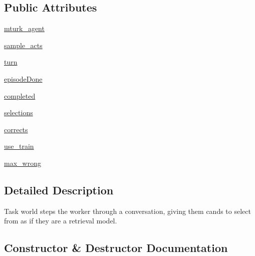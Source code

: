 \subsection*{Public Attributes}
\begin{DoxyCompactItemize}
\item 
\hyperlink{classlight__chat__eval_1_1worlds_1_1LightEvalTaskWorld_ac8f15206b335ec5ea3498a3ee1b0f65f}{mturk\+\_\+agent}
\item 
\hyperlink{classlight__chat__eval_1_1worlds_1_1LightEvalTaskWorld_a60c0b70ca0cfb7d35c2b0eac85df0cf1}{sample\+\_\+acts}
\item 
\hyperlink{classlight__chat__eval_1_1worlds_1_1LightEvalTaskWorld_a54478e731c75aaf71048894bb762a005}{turn}
\item 
\hyperlink{classlight__chat__eval_1_1worlds_1_1LightEvalTaskWorld_ab0ffce12733c1c46f5dc64b1a802f1e2}{episode\+Done}
\item 
\hyperlink{classlight__chat__eval_1_1worlds_1_1LightEvalTaskWorld_a1deec2abb5e96799ec49097721586013}{completed}
\item 
\hyperlink{classlight__chat__eval_1_1worlds_1_1LightEvalTaskWorld_a9dac942996f55099107ba813e91ce437}{selections}
\item 
\hyperlink{classlight__chat__eval_1_1worlds_1_1LightEvalTaskWorld_a89359a6fdc961c97b5859980b3790540}{corrects}
\item 
\hyperlink{classlight__chat__eval_1_1worlds_1_1LightEvalTaskWorld_ad605071600d13b139e24541051eb4afb}{use\+\_\+train}
\item 
\hyperlink{classlight__chat__eval_1_1worlds_1_1LightEvalTaskWorld_a272355df766ac2722a7547deb5755651}{max\+\_\+wrong}
\end{DoxyCompactItemize}


\subsection{Detailed Description}
\begin{DoxyVerb}Task world steps the worker through a conversation, giving them cands to select from
as if they are a retrieval model.
\end{DoxyVerb}
 

\subsection{Constructor \& Destructor Documentation}
\mbox{\label{classlight__chat__eval_1_1worlds_1_1LightEvalTaskWorld_a9f9e7de884af532dc436e72c8c0011fc}} 
